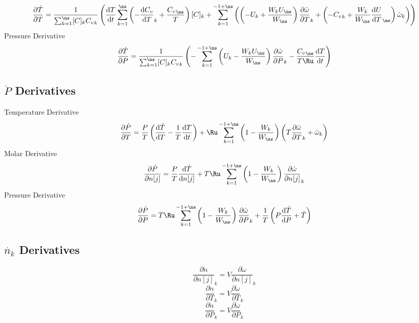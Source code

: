 \documentclass[a4paper,10pt]{article}
\begin{document}
\begin{dmath} \frac{\partial\dot{T}}{\partial{T}} = \frac{1}{\sum_{k=1}^{\ns} [C]_{k} {C_v}_{k}} \left(\frac{\text{d} T }{\text{d} t } \sum_{k=1}^{\ns} \left(- \frac{\text{d} {C_v} }{\text{d} T }_{k} + \frac{{C_v}_{\ns}}{T}\right) [C]_{k} + \sum_{k=1}^{-1 + \ns} \left(\left(- U_{k} + \frac{W_{k} U_{\ns}}{W_{\ns}}\right) \frac{\partial \dot{\omega} }{\partial T }_{k} + \left(- {C_v}_{k} + \frac{W_{k}}{W_{\ns}} \frac{\text{d} U }{\text{d} T }_{\ns}\right) \dot{\omega}_{k}\right)\right)\end{dmath} 
Pressure Derivative
\begin{dmath} \frac{\partial\dot{T}}{\partial{P}} = \frac{1}{\sum_{k=1}^{\ns} [C]_{k} {C_v}_{k}} \left(- \sum_{k=1}^{-1 + \ns} \left(U_{k} - \frac{W_{k} U_{\ns}}{W_{\ns}}\right) \frac{\partial \dot{\omega} }{\partial P }_{k} - \frac{{C_v}_{\ns}}{T \Ru} \frac{\text{d} T }{\text{d} t }\right)\end{dmath} 
\subsection{\texorpdfstring{$\dot{P}$}{dPdt} Derivatives}
Temperature Derivative
\begin{dmath} \frac{\partial \dot{ P } }{\partial T } = \frac{P}{T} \left(\frac{\text{d} \dot{T} }{\text{d} T } - \frac{1}{T} \frac{\text{d} T }{\text{d} t }\right) + \Ru \sum_{k=1}^{-1 + \ns} \left(1 - \frac{W_{k}}{W_{\ns}}\right) \left(T \frac{\partial \dot{\omega} }{\partial T }_{k} + \dot{\omega}_{k}\right)\end{dmath} 
Molar Derivative
\begin{dmath} \frac{\partial \dot{ P } }{\partial n[j] } = \frac{P}{T} \frac{\text{d} \dot{T} }{\text{d} n[j] } + T \Ru \sum_{k=1}^{-1 + \ns} \left(1 - \frac{W_{k}}{W_{\ns}}\right) \frac{\partial \dot{\omega} }{\partial n[j] }_{k}\end{dmath} 
Pressure Derivative
\begin{dmath} \frac{\partial \dot{ P } }{\partial P } = T \Ru \sum_{k=1}^{-1 + \ns} \left(1 - \frac{W_{k}}{W_{\ns}}\right) \frac{\partial \dot{\omega} }{\partial P }_{k} + \frac{1}{T} \left(P \frac{\text{d} \dot{T} }{\text{d} P } + \dot{T}\right)\end{dmath} 
\subsection{\texorpdfstring{$\dot{n_k}$}{dnkdt} Derivatives}
\begin{dmath} \frac{\partial \dot{n} }{\partial n[j] }_{k} = V \frac{\partial \dot{\omega} }{\partial n[j] }_{k}\end{dmath} 
\begin{dmath} \frac{\partial \dot{n} }{\partial T }_{k} = V \frac{\partial \dot{\omega} }{\partial T }_{k}\end{dmath} 
\begin{dmath} \frac{\partial \dot{n} }{\partial P }_{k} = V \frac{\partial \dot{\omega} }{\partial P }_{k}\end{dmath} 
\end{document}
